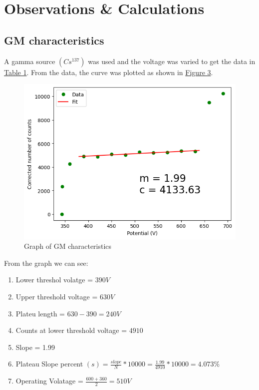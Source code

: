 \section{Observations \& Calculations}
	\subsection{GM characteristics}
		A gamma source $(Cs^{137})$ was used and the voltage was varied to get the data in \hyperref[tab:1]{Table 1}. From the data, the curve was plotted as shown in \hyperref[graph:1]{Figure 3}.

		
		\begin{figure}[h]
			\centering
			\includegraphics[width=\columnwidth]{images/g1.png}
			\caption{Graph of GM characteristics}
			\label{graph:1}
		\end{figure}

		From the graph we can see:
		\begin{enumerate}
			\item Lower threshol volatge = $390 V$
			\item Upper threshold voltage = $630 V$
			\item Plateu length = $630 - 390 = 240 V$
			\item Counts at lower threshold voltage = $4910$
			\item Slope = 1.99
			\item Plateau Slope percent $(s) = \frac{slope}{N}*10000 = \frac{1.99}{4910}*10000 = 4.073\%$
			\item Operating Volatage = $\frac{600+360}{2} = 510 V$
		\end{enumerate}

